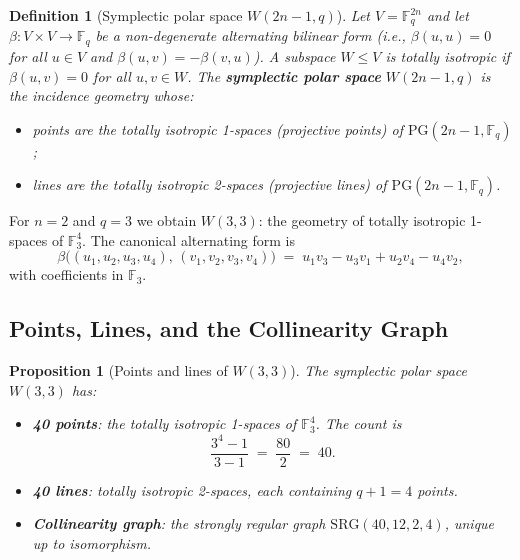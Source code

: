 ﻿\documentclass[12pt]{article}
\newtheorem{proposition}[theorem]{Proposition}
\newtheorem{definition}[theorem]{Definition}
\newcommand{\SRG}[4]{\mathrm{SRG}(#1,#2,#3,#4)}
\newcommand{\GF}[1]{\mathbb{F}_{#1}}
\newcommand{\PG}[2]{\mathrm{PG}(#1,#2)}
\begin{document}
\begin{definition}[Symplectic polar space $W(2n-1,q)$]\label{def:sympl}
Let $V = \GF{q}^{2n}$ and let $\beta : V \times V \to \GF{q}$ be a non-degenerate
alternating bilinear form (i.e., $\beta(u,u) = 0$ for all $u \in V$ and
$\beta(u,v) = -\beta(v,u)$).  A subspace $W \le V$ is \emph{totally isotropic} if
$\beta(u,v) = 0$ for all $u,v \in W$.  The \textbf{symplectic polar space}
$W(2n-1,q)$ is the incidence geometry whose:
\begin{itemize}[noitemsep]
  \item \emph{points} are the totally isotropic 1-spaces (projective points) of
    $\PG{2n-1}{\GF{q}}$;
  \item \emph{lines} are the totally isotropic 2-spaces (projective lines) of
    $\PG{2n-1}{\GF{q}}$.
\end{itemize}
\end{definition}

For $n=2$ and $q=3$ we obtain $W(3,3)$: the geometry of totally isotropic
1-spaces of $\GF{3}^4$.  The canonical alternating form is
\begin{equation}
  \beta\bigl((u_1,u_2,u_3,u_4),\,(v_1,v_2,v_3,v_4)\bigr)
  \;=\; u_1 v_3 - u_3 v_1 + u_2 v_4 - u_4 v_2,
\end{equation}
with coefficients in $\GF{3}$.

\subsection{Points, Lines, and the Collinearity Graph}

\begin{proposition}[Points and lines of $W(3,3)$]\label{prop:pts}
The symplectic polar space $W(3,3)$ has:
\begin{itemize}[noitemsep]
  \item \textbf{40 points}: the totally isotropic 1-spaces of $\GF{3}^4$.  The count
    is
    \begin{equation}
      \frac{3^4 - 1}{3 - 1} \;=\; \frac{80}{2} \;=\; 40.
      \label{eq:pts}
    \end{equation}
  \item \textbf{40 lines}: totally isotropic 2-spaces, each containing $q+1=4$ points.
  \item \textbf{Collinearity graph}: the strongly regular graph $\SRG{40}{12}{2}{4}$,
    unique up to isomorphism.
\end{itemize}
\end{proposition}
\end{document}
